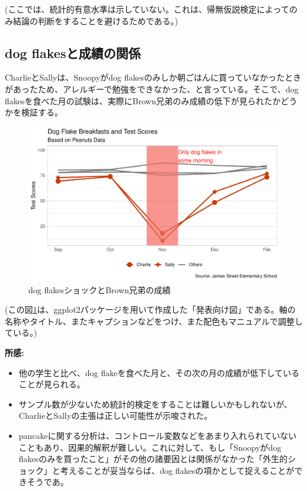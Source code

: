 \documentclass[xelatex,ja=standard]{bxjsarticle}
\begin{document}
(ここでは、統計的有意水準は示していない。これは、帰無仮説検定によってのみ結論の判断をすることを避けるためである。)

\subsection{dog flakesと成績の関係}

CharlieとSallyは、Snoopyがdog flakesのみしか朝ごはんに買っていなかったときがあったため、アレルギーで勉強をできなかった、と言っている。そこで、dog flakesを食べた月の試験は、実際にBrown兄弟のみ成績の低下が見られたかどうかを検証する。

\begin{figure}[h!]
\centering
\includegraphics[width=12cm]{04_analyze/dog_flakes_study/figure/dog_flakes_study.pdf}
\caption{dog flakesショックとBrown兄弟の成績}
\label{fig:img2}
\end{figure}

(この図\ref{fig:img2}は、ggplot2パッケージを用いて作成した「発表向け図」である。軸の名称やタイトル、またキャプションなどをつけ、また配色もマニュアルで調整している。)

\textbf{所感:}
\begin{itemize}
\item 他の学生と比べ、dog flakeを食べた月と、その次の月の成績が低下していることが見られる。
\item サンプル数が少ないため統計的検定をすることは難しいかもしれないが、CharlieとSallyの主張は正しい可能性が示唆された。
\item pancakeに関する分析は、コントロール変数などをあまり入れられていないこともあり、因果的解釈が難しい。これに対して、もし「Snoopyがdog flakesのみを買ったこと」がその他の諸要因とは関係がなかった「外生的ショック」と考えることが妥当ならば、dog flakesの項かとして捉えることができそうであ。

\end{itemize}

\newpage

 

% 
%

%
%
\end{document}
